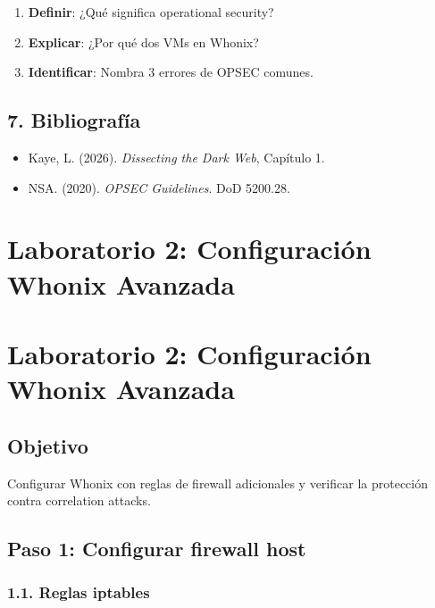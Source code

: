 \documentclass[
  letterpaper,
]{report}
\providecommand{\tightlist}{%
  \setlength{\itemsep}{0pt}\setlength{\parskip}{0pt}}
\begin{document}
\begin{enumerate}
\def\labelenumi{\arabic{enumi}.}
\tightlist
\item
  \textbf{Definir}: ¿Qué significa operational security?
\item
  \textbf{Explicar}: ¿Por qué dos VMs en Whonix?
\item
  \textbf{Identificar}: Nombra 3 errores de OPSEC comunes.
\end{enumerate}

\section{7. Bibliografía}\label{bibliografuxeda-2}

\begin{itemize}
\tightlist
\item
  Kaye, L. (2026). \emph{Dissecting the Dark Web}, Capítulo 1.
\item
  NSA. (2020). \emph{OPSEC Guidelines}. DoD 5200.28.
\end{itemize}

\chapter{Laboratorio 2: Configuración Whonix
Avanzada}\label{laboratorio-2-configuraciuxf3n-whonix-avanzada}

\chapter{Laboratorio 2: Configuración Whonix
Avanzada}\label{laboratorio-2-configuraciuxf3n-whonix-avanzada-1}

\section{Objetivo}\label{objetivo-1}

Configurar Whonix con reglas de firewall adicionales y verificar la
protección contra correlation attacks.

\section{Paso 1: Configurar firewall
host}\label{paso-1-configurar-firewall-host}

\subsection{1.1. Reglas iptables}\label{reglas-iptables}
\end{document}
